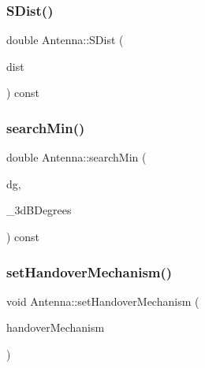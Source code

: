 \mbox{\label{class_antenna_ae60ab40ded94be407c3b7455f4e886fe}} 
\subsubsection{\texorpdfstring{S\+Dist()}{SDist()}}
{\footnotesize\ttfamily double Antenna\+::\+S\+Dist (\begin{DoxyParamCaption}\item[{double}]{dist }\end{DoxyParamCaption}) const\hspace{0.3cm}{\ttfamily [private]}}

\mbox{\label{class_antenna_a48ef89b0d1bd313bae4ca863da1cc77e}} 
\subsubsection{\texorpdfstring{search\+Min()}{searchMin()}}
{\footnotesize\ttfamily double Antenna\+::search\+Min (\begin{DoxyParamCaption}\item[{double}]{dg,  }\item[{vector$<$ pair$<$ double, double $>$$>$}]{\+\_\+3d\+B\+Degrees }\end{DoxyParamCaption}) const\hspace{0.3cm}{\ttfamily [private]}}

\mbox{\label{class_antenna_a08ae04778bc036f108762fa9be818332}} 
\subsubsection{\texorpdfstring{set\+Handover\+Mechanism()}{setHandoverMechanism()}}
{\footnotesize\ttfamily void Antenna\+::set\+Handover\+Mechanism (\begin{DoxyParamCaption}\item[{\hyperlink{class_holdable_agent_ae2c334b004d7b9c5a999cf2618e4e518}{Holdable\+Agent\+::\+C\+O\+N\+N\+E\+C\+T\+I\+O\+N\+\_\+\+T\+Y\+PE}}]{handover\+Mechanism }\end{DoxyParamCaption})}

